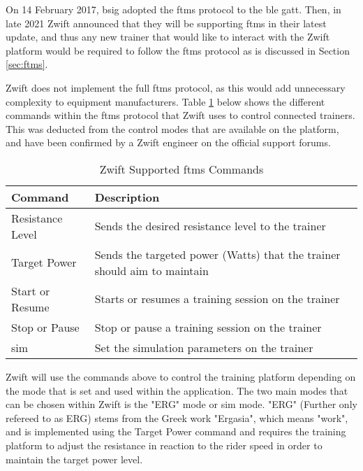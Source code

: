 On 14 February 2017, \ac{bsig} adopted the \ac{ftms} protocol to the \ac{ble} \ac{gatt}. Then, in late 2021 Zwift announced that they will be supporting \ac{ftms} in their latest update, and thus any new trainer that would like to interact with the Zwift platform would be required to follow the \ac{ftms} protocol as is discussed in Section \ref{sec:ftms}. \citep{Jeremy:2021}

Zwift does not implement the full \ac{ftms} protocol, as this would add unnecessary complexity to equipment manufacturers. Table \ref{tab:blreq} below shows the different commands within the \ac{ftms} protocol that Zwift uses to control connected trainers. This was deducted from the control modes that are available on the platform, and have been confirmed by a Zwift engineer on the official support forums. \citep{Jeremy:2021}

\begin{table}[H]
	\renewcommand{\arraystretch}{1.5}
	\centering
	\caption{Zwift Supported \ac{ftms} Commands}
	\begin{tabularx}{\textwidth}{ >{\raggedright}p{4cm} X}
		\toprule
		Command          & Description                                                              \\
		\midrule
		Resistance Level & Sends the desired resistance level to the trainer                        \\
		Target Power     & Sends the targeted power (Watts) that the trainer should aim to maintain \\
		Start or Resume  & Starts or resumes a training session on the trainer                      \\
		Stop or Pause    & Stop or pause a training session on the trainer                          \\
		\ac{sim}         & Set the simulation parameters on the trainer                             \\
		\bottomrule
	\end{tabularx}
	\label{tab:blreq}
\end{table}

Zwift will use the commands above to control the training platform depending on the mode that is set and used within the application. The two main modes that can be chosen within Zwift is the "ERG" mode or \acf{sim} mode. "ERG" (Further only refereed to as ERG) stems from the Greek work "Ergasia", which means "work", and is implemented using the Target Power command and requires the training platform to adjust the resistance in reaction to the rider speed in order to maintain the target power level. 

